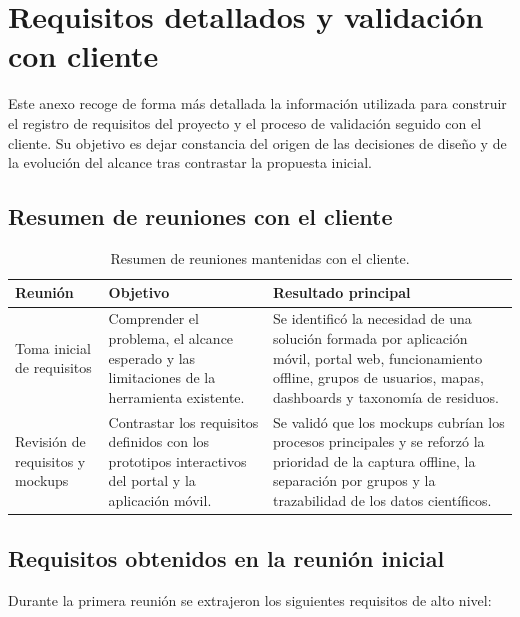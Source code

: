 \chapter{Requisitos detallados y validación con cliente}
\label{sec:anexo_requisitos_detallados}

Este anexo recoge de forma más detallada la información utilizada para construir el
registro de requisitos del proyecto y el proceso de validación seguido con el
cliente. Su objetivo es dejar constancia del origen de las decisiones de diseño y
de la evolución del alcance tras contrastar la propuesta inicial.

\section{Resumen de reuniones con el cliente}

\begin{table}[H]
  \centering
  \caption{Resumen de reuniones mantenidas con el cliente.}
  \label{tab:reuniones_cliente}
  \begin{tabularx}{\textwidth}{p{3.3cm}X X}
    \toprule
    \textbf{Reunión} & \textbf{Objetivo} & \textbf{Resultado principal} \\
    \midrule
    Toma inicial de requisitos &
    Comprender el problema, el alcance esperado y las limitaciones de la herramienta
    existente. &
    Se identificó la necesidad de una solución formada por aplicación móvil,
    portal web, funcionamiento offline, grupos de usuarios, mapas, dashboards y
    taxonomía de residuos. \\[4pt]

    Revisión de requisitos y mockups &
    Contrastar los requisitos definidos con los prototipos interactivos del portal
    y la aplicación móvil. &
    Se validó que los mockups cubrían los procesos principales y se reforzó la
    prioridad de la captura offline, la separación por grupos y la trazabilidad de
    los datos científicos. \\
    \bottomrule
  \end{tabularx}
\end{table}

\section{Requisitos obtenidos en la reunión inicial}

Durante la primera reunión se extrajeron los siguientes requisitos de alto nivel:

